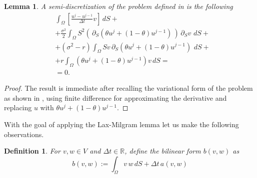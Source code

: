 \documentclass{article}
\newtheorem{df}{Definition}[section]
\newtheorem{lemma}[thm]{Lemma}
\newcommand{\argwrapsquare}[1]{\left[#1\right]}
\newcommand{\intS}[1]{\ensuremath{\int_{\Omega}#1 \, dS}}
\newcommand{\intSlong}[1]{\intS{\argwrapsquare{#1}}}
\newcommand{\darg}[2]{\ensuremath{\, \partial_{#2}#1} \, }
\newcommand{\dt}[1]{\ensuremath{\darg{#1}{t}}}
\newcommand{\dS}[1]{\ensuremath{\darg{#1}{S}}}
\newcommand{\dtu}{\dt{u}}
\newcommand{\dSv}{\dS{v}}
\newcommand{\sigmafrac}{\ensuremath{\frac{\sigma^2}{2}}}
\newcommand{\aform}[2]{\ensuremath{\sigmafrac \intS{S^2 \dS{#2} \dS{#1}} + (\sigma^2 - r) \intS{S #2 \dS{#1}} + \intS{r  #1  #2}}}
\newcommand{\auv}{\aform{u}{v}}
\begin{document}
\begin{lemma}\label{lemma:semi_discrete_prob}
    A semi-discretization of the problem defined in  is the following
     \begin{align*}
        &\intSlong{\frac{u^{j} - u^{j-1}}{\Delta t}  v} + \\
        &+\sigmafrac \intS{S^2 \left(\dS{\left(\theta u^{j} + (1- \theta) u^{j-1} \right)}\right) \dSv} + \\
        &+ (\sigma^2 - r) \intS{S v \dS{\left(\theta u^{j} + (1- \theta) u^{j-1} \right)}} + \\
        &+r \intS{\left(\theta u^{j} + (1- \theta) u^{j-1} \right)v} =\\
        &=0.
        \end{align*}
\end{lemma}
\begin{proof}
    The result is immediate after recalling the variational form of the problem as shown in , using finite difference for approximating the derivative and replacing $u$ with $\theta u^{j} + (1- \theta) u^{j-1}$. \qedhere
    
\end{proof}
With the goal of applying the Lax-Milgram lemma  let us make the following observations.


\begin{df}\label{def:b}
    For $v,w \in V$ and $\Delta t \in \mathbb{R}$, define the bilinear form $b(v, w)$ as
    \begin{equation*}
        b(v, w) := \intS{v\,w} + \Delta t\,a(v,w)
    \end{equation*}
\end{df}
\end{document}
